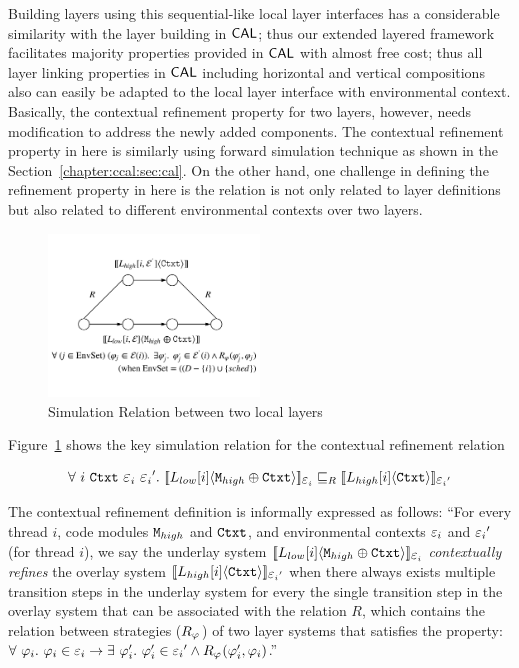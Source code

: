 Building layers using this sequential-like local layer interfaces has a considerable similarity with 
the layer building in $\mathsf{CAL}$; thus 
our extended layered framework facilitates
majority properties provided in $\mathsf{CAL}$ with almost free cost;
thus all layer linking properties in $\mathsf{CAL}$ including horizontal and vertical compositions also can 
easily be adapted to the local layer interface with environmental context.
Basically, the contextual refinement property for two layers, however, needs modification to address the newly added components. 
The contextual refinement property in here is similarly using forward simulation technique as shown in the 
Section~\ref{chapter:ccal:sec:cal}.
On the other hand, one challenge in defining the refinement property in here is the relation is not only related to layer definitions but also related to different environmental contexts over two layers. 
\begin{figure}
\begin{center}
\includegraphics[width=0.5\textwidth]{figs/ccal/locallayerrefinement}
\end{center}
\caption{Simulation Relation between two local layers}
\label{fig:chapter:ccal:refinement-between-two-layers}
\end{figure}
Figure~\ref{fig:chapter:ccal:refinement-between-two-layers} shows the key simulation relation for 
the contextual refinement relation 
\begin{definition}
$$
\forall \ i\  \codeinmath{Ctxt} \ \oracle_i \ \oracle_i' .\ \sem{L_{low}[i]}{\codeinmath{M}_{high} \oplus \codeinmath{Ctxt}}_{\oracle_i} \refines_R \sem{L_{high}[i]}{\codeinmath{Ctxt}}_{\oracle_i'}
$$
\end{definition}
The contextual refinement definition is informally expressed as follows:
{\quote
``For every thread $i$,  code modules ${\mathrm{\texttt{M}}}_{high}$ and  ${\mathrm{\texttt{Ctxt}}}$,  and environmental contexts
  $\oracle_i$ and $\oracle_i'$ (for thread $i$), we say the underlay system   $\sem{L_{low}[i]}{\codeinmath{M}_{high} \oplus \codeinmath{Ctxt}}_{\oracle_i}$
     \textit{contextually
 refines} the overlay system $ \sem{L_{high}[i]}{\codeinmath{Ctxt}}_{\oracle_i'}$ when there always exists 
 multiple  transition steps in the underlay system for every the single  transition step
  in the overlay system that can be associated with the relation $R$,
which contains the relation between strategies ($R_{\varphi_{}}$)
 of two layer systems that satisfies the property:
$\forall \ \strat{i} . \ \strat{i} \in \oracle_i \rightarrow \exists \ \stratp{i} . \ \stratp{i} \in \oracle_i' \wedge R_{\strat{}}(\stratp{i}, \strat{i})$.''}

